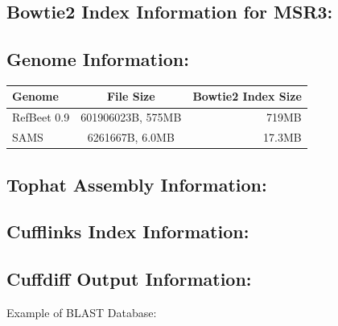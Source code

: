 \documentclass{article}
\begin{document}
\subsection{Bowtie2 Index Information for MSR3:}

\subsection{Genome Information:}

	\begin{tabular}{| l | | c | r |}
	\hline
	Genome & File Size & Bowtie2 Index Size \\ \hline
	RefBeet 0.9 & 601906023B, 575MB & 719MB \\ \hline
	SAMS & 6261667B, 6.0MB & 17.3MB \\ \hline
	\end{tabular}

\subsection{Tophat Assembly Information:}

\subsection{Cufflinks Index Information:}

\subsection{Cuffdiff Output Information:}

Example of BLAST Database:

	
\end{document}

